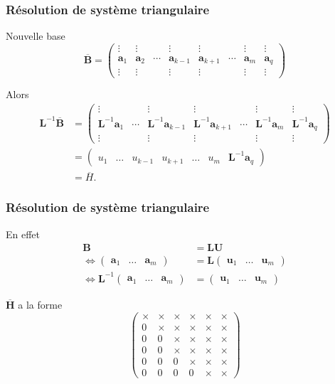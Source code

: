 \documentclass[usepdftitle=false]{beamer}
\def\ba{\boldsymbol{a}}
\def\bu{\boldsymbol{u}}
\def\bB{\boldsymbol{B}}
\def\bH{\boldsymbol{H}}
\def\bL{\boldsymbol{L}}
\def\bU{\boldsymbol{U}}
\begin{document}
\begin{frame}
\frametitle{Résolution de système triangulaire}

Nouvelle base
\[
\overline{\bB} =
\begin{pmatrix}
\vdots & \vdots & & \vdots & \vdots & & \vdots & \vdots \\
\ba_1 & \ba_2 & \cdots & \ba_{k-1} & \ba_{k+1} & \cdots & \ba_m & \ba_q \\
\vdots & \vdots & & \vdots & \vdots & & \vdots & \vdots
\end{pmatrix}
\]

\mbox{}

Alors
\begin{align*}
\bL^{-1}\overline{\bB} &=
\begin{pmatrix}
\vdots& & \vdots & \vdots & & \vdots & \vdots \\
\bL^{-1}\ba_1 & \cdots & \bL^{-1}\ba_{k-1} & \bL^{-1}\ba_{k+1} & \cdots & \bL^{-1}\ba_m & \bL^{-1}\ba_q \\
\vdots & & \vdots & \vdots & & \vdots & \vdots
\end{pmatrix} \\
&=
\begin{pmatrix}
 u_1 & \ldots & u_{k-1} & u_{k+1} & \ldots & u_m & \bL^{-1}\ba_q
\end{pmatrix}
\\
&=
\overline{H}.
\end{align*}

\end{frame}

\begin{frame}
\frametitle{Résolution de système triangulaire}

En effet
\begin{align*}
\bB &= \bL \bU \\
\Leftrightarrow
\begin{pmatrix}
\ba_1 & \ldots & \ba_m
\end{pmatrix}
&=
\bL
\begin{pmatrix}
\bu_1 & \ldots & \bu_m
\end{pmatrix} \\
\Leftrightarrow \bL^{-1}
\begin{pmatrix}
\ba_1 & \ldots & \ba_m
\end{pmatrix}
&=
\begin{pmatrix}
\bu_1 & \ldots & \bu_m
\end{pmatrix}
\end{align*}

\mbox{}

$\overline{\bH}$ a la forme
\[
\begin{pmatrix}
\times & \times & \times & \times & \times & \times \\
0 & \times & \times & \times & \times & \times \\
0 & 0 & \times & \times & \times & \times \\
0 & 0 & \times & \times & \times & \times \\
0 & 0 & 0 & \times & \times & \times \\
0 & 0 & 0 & 0 & \times & \times
\end{pmatrix}
\]

\end{frame}
\end{document}
